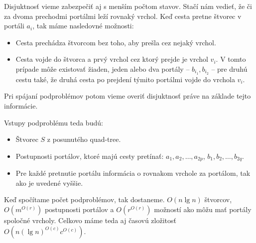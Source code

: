 Disjuktnosť vieme zabezpečiť aj s menším počtom stavov.
Stačí nám vedieť, že či za dvoma prechodmi portálmi leží rovnaký vrchol.
Keď cesta pretne štvorec v portáli $a_i$, tak máme nasledovné možnosti:
\begin{itemize}
\item Cesta prechádza štvorcom bez toho, aby prešla cez nejaký vrchol.
\item Cesta vojde do štvorca a prvý vrchol cez ktorý prejde je vrchol $v_i$.
V tomto prípade môže existovať žiaden, jeden alebo dva portály -- $b_{i_1}, b_{i_2}$ --
pre druhú cestu také, že druhá cesta po prejdení týmito portálmi vojde
do vrchola $v_i$.
\end{itemize}

Pri spájaní podproblémov potom vieme overiť disjuktnosť práve na základe tejto informácie.

Vstupy podproblému teda budú:
\begin{itemize}
\item Štvorec $S$ z posunutého quad-tree.
\item Postupnosti portálov, ktoré majú cesty pretínať: $a_1, a_2, \dots, a_{2p}$, $b_1, b_2, \dots, b_{2q}$.
\item Pre každé pretnutie portálu informácia o rovnakom vrchole za portálom, tak ako je uvedené
vyššie.
\end{itemize}

Keď spočítame počet podproblémov, tak dostaneme. $O(n \lg n)$ štvorcov, $O(m^{O(r)})$
postupnosti portálov a $O(r^{O(r)})$ možností ako môžu mať portály spoločné vrcholy.
Celkovo máme teda aj časovú zložitosť $O(n (\lg n)^{O(c)} c^{O(c)})$. 
